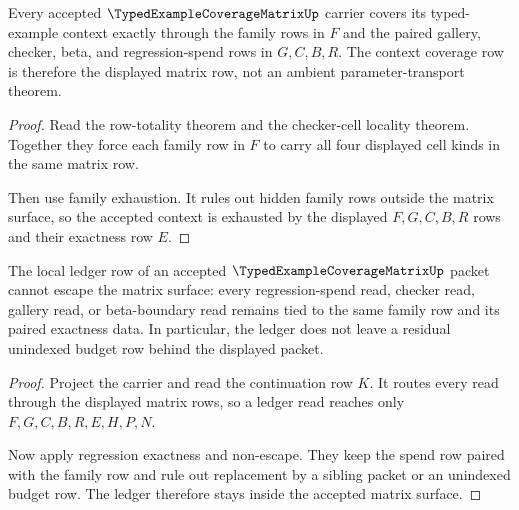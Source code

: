 \begin{theorem}
\label{thm:typed-example-coverage-matrix-context-coverage}
Every accepted $\TypedExampleCoverageMatrixUp$ carrier covers its typed-example context exactly through the family rows in $F$ and the paired gallery, checker, beta, and regression-spend rows in $G,C,B,R$. The context coverage row is therefore the displayed matrix row, not an ambient parameter-transport theorem.
\end{theorem}
\begin{proof}
Read the row-totality theorem and the checker-cell locality theorem. Together they force each family row in $F$ to carry all four displayed cell kinds in the same matrix row.

Then use family exhaustion. It rules out hidden family rows outside the matrix surface, so the accepted context is exhausted by the displayed $F,G,C,B,R$ rows and their exactness row $E$.
\end{proof}
\begin{theorem}
\label{thm:typed-example-coverage-matrix-ledger-nonescape}
The local ledger row of an accepted $\TypedExampleCoverageMatrixUp$ packet cannot escape the matrix surface: every regression-spend read, checker read, gallery read, or beta-boundary read remains tied to the same family row and its paired exactness data. In particular, the ledger does not leave a residual unindexed budget row behind the displayed packet.
\end{theorem}
\begin{proof}
Project the carrier and read the continuation row $K$. It routes every read through the displayed matrix rows, so a ledger read reaches only $F,G,C,B,R,E,H,P,N$.

Now apply regression exactness and non-escape. They keep the spend row paired with the family row and rule out replacement by a sibling packet or an unindexed budget row. The ledger therefore stays inside the accepted matrix surface.
\end{proof}

